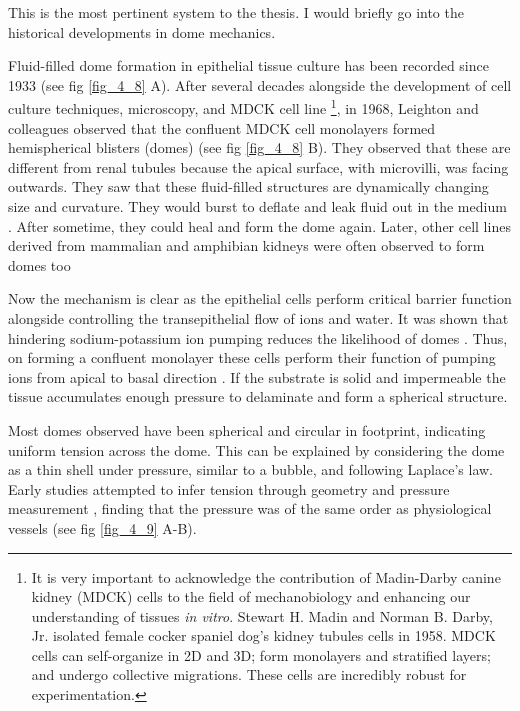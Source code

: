 This is the most pertinent system to the thesis. I would briefly go into the historical developments in dome mechanics. 
	
Fluid-filled dome formation in epithelial tissue culture has been recorded since 1933 \cite{cameron1953} (see fig \ref{fig_4_8} A). After several decades alongside the development of cell culture techniques, microscopy, and MDCK cell line \footnote{It is very important to acknowledge the contribution of Madin-Darby canine kidney (MDCK) cells to the field of mechanobiology and enhancing our understanding of tissues \textit{in vitro}. Stewart H. Madin and Norman B. Darby, Jr. isolated female cocker spaniel dog’s kidney tubules cells in 1958. MDCK cells can self-organize in 2D and 3D; form monolayers and stratified layers; and undergo collective migrations. These cells are incredibly robust for experimentation.}, in 1968, Leighton and colleagues observed that the confluent MDCK cell monolayers formed hemispherical blisters (domes) \cite{leighton1969} (see fig \ref{fig_4_8} B). They observed that these are different from renal tubules because the apical surface, with microvilli, was facing outwards. They saw that these fluid-filled structures are dynamically changing size and curvature. They would burst to deflate and leak fluid out in the medium \cite{valentich1979}. After sometime, they could heal and form the dome again. Later, other cell lines derived from mammalian and amphibian kidneys were often observed to form domes too \cite{dulbecco1980, leighton1981, lever1979}
	
Now the mechanism is clear as the epithelial cells perform critical barrier function alongside controlling the transepithelial flow of ions and water. It was shown that hindering sodium-potassium ion pumping reduces the likelihood of domes \cite{leighton1969}. Thus, on forming a confluent monolayer these cells perform their function of pumping ions from apical to basal direction \cite{valentich1979}. If the substrate is solid and impermeable the tissue accumulates enough pressure to delaminate and form a spherical structure.

Most domes observed have been spherical and circular in footprint, indicating uniform tension across the dome. This can be explained by considering the dome as a thin shell under pressure, similar to a bubble, and following Laplace's law. Early studies attempted to infer tension through geometry and pressure measurement \cite{tanner1983}, finding that the pressure was of the same order as physiological vessels (see fig \ref{fig_4_9} A-B).

